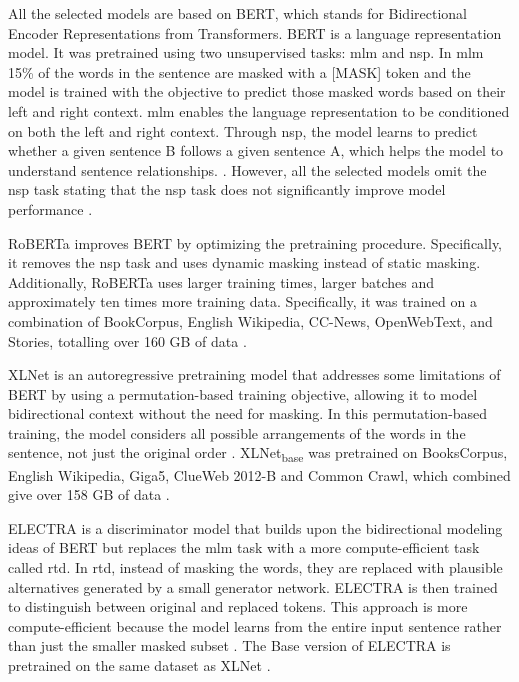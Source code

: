 All the selected models are based on BERT, which stands for Bidirectional Encoder Representations from Transformers. BERT is a language representation model. It was pretrained using two unsupervised tasks: \gls{mlm} and \gls{nsp}. In \gls{mlm} 15\% of the words in the sentence are masked with a [MASK] token and the model is trained with the objective to predict those masked words based on their left and right context. \gls{mlm} enables the language representation to be conditioned on both the left and right context. Through \gls{nsp}, the model learns to predict whether a given sentence B follows a given sentence A, which helps the model to understand sentence relationships. \cite{bert2019}. However, all the selected models omit the \gls{nsp} task stating that the \gls{nsp} task does not significantly improve model performance \cite{roberta2019, xlnet2019, electra2020}.

RoBERTa improves BERT by optimizing the pretraining procedure. Specifically, it removes the \gls{nsp} task and uses dynamic masking instead of static masking. Additionally, RoBERTa uses larger training times, larger batches and approximately ten times more training data. Specifically, it was trained on a combination of BookCorpus, English Wikipedia, CC-News, OpenWebText, and Stories, totalling over 160 GB of data \cite{roberta2019}.

XLNet is an autoregressive pretraining model that addresses some limitations of BERT by using a permutation-based training objective, allowing it to model bidirectional context without the need for masking. In this permutation-based training, the model considers all possible arrangements of the words in the sentence, not just the original order \cite{xlnet2019}. XLNet\textsubscript{base} was pretrained on BooksCorpus, English Wikipedia, Giga5, ClueWeb 2012-B and Common Crawl, which combined give over 158 GB of data \cite{xlnet_github, xlnet2019}.

ELECTRA is a discriminator model that builds upon the bidirectional modeling ideas of BERT but replaces the \gls{mlm} task with a more compute-efficient task called \gls{rtd}. In \gls{rtd}, instead of masking the words, they are replaced with plausible alternatives generated by a small generator network. ELECTRA is then trained to distinguish between original and replaced tokens. This approach is more compute-efficient because the model learns from the entire input sentence rather than just the smaller masked subset \cite{electra2020}. The Base version of ELECTRA is pretrained on the same dataset as XLNet \cite{electra_github, electra2020}.

